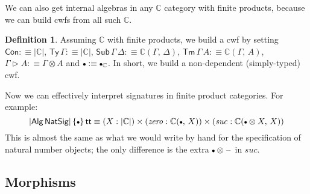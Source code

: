\documentclass[12pt,a4paper,twoside,openany]{book}
\theoremstyle{remark}
\theoremstyle{definition}
\newtheorem{mydefinition}{Definition}
\theoremstyle{theorem}
\newcommand{\mi}[1]{\mathit{#1}}
\newcommand{\ms}[1]{\mathsf{#1}}
\newcommand{\mbb}[1]{\mathbb{#1}}
\newcommand{\Con}{\mathsf{Con}}
\newcommand{\Sub}{\mathsf{Sub}}
\newcommand{\Tm}{\mathsf{Tm}}
\newcommand{\Ty}{\mathsf{Ty}}
\renewcommand{\tt}{\mathsf{tt}}
\newcommand{\blank}{\mathord{\hspace{1pt}\text{--}\hspace{1pt}}}
\newcommand{\ext}{\triangleright}
\newcommand{\emptycon}{\scaleobj{.75}\bullet}
\newcommand{\Alg}{\ms{Alg}}
\newcommand{\mbbC}{\mbb{C}}
\newcommand{\defn}{:\equiv}
\begin{document}
We can also get internal algebras in any $\mbbC$ category with finite products,
because we can build cwfs from all such $\mbbC$.

\begin{mydefinition} Assuming $\mbbC$ with finite products, we build a cwf by setting
$\Con \defn |\mbbC|$, $\Ty\,\Gamma \defn |\mbbC|$, $\Sub\,\Gamma\,\Delta \defn \mbbC(\Gamma,\,\Delta)$, $\Tm\,\Gamma\,A \defn \mbbC(\Gamma,\,A)$, $\Gamma \ext A \defn \Gamma \otimes A$ and $\emptycon \defn \emptycon_{\mbbC}$. In short, we build a non-dependent (simply-typed) cwf.
\end{mydefinition}

Now we can effectively interpret signatures in finite product categories. For
example:
\[
|\Alg\,\ms{NatSig}|\,\{\emptycon\}\,\tt \equiv
(X : |\mbbC|) \times (\mi{zero} : \mbbC(\emptycon,\,X)) \times (\mi{suc} : \mbbC(\emptycon \otimes X,\,X))
\]
This is almost the same as what we would write by hand for the specification of
natural number objects; the only difference is the extra $\emptycon
\otimes\blank$ in $\mi{suc}$.

\subsection{Morphisms}
\end{document}
